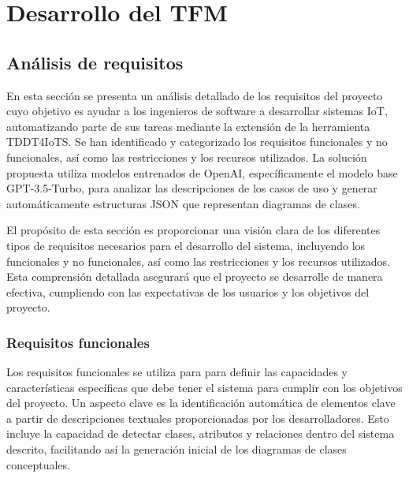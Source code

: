 \chapter{Desarrollo del TFM}\label{chapter:desarrollo}

\section{Análisis de requisitos}

En esta sección se presenta un análisis detallado de los requisitos del proyecto cuyo objetivo es ayudar a los ingenieros de software a desarrollar sistemas IoT, automatizando parte de sus tareas mediante la extensión de la herramienta TDDT4IoTS. Se han identificado y categorizado los requisitos funcionales y no funcionales, así como las restricciones y los recursos utilizados. La solución propuesta utiliza modelos entrenados de OpenAI, específicamente el modelo base GPT-3.5-Turbo, para analizar las descripciones de los casos de uso y generar automáticamente estructuras JSON que representan diagramas de clases.


El propósito de esta sección es proporcionar una visión clara de los diferentes tipos de requisitos necesarios para el desarrollo del sistema, incluyendo los funcionales y no funcionales, así como las restricciones y los recursos utilizados. Esta comprensión detallada asegurará que el proyecto se desarrolle de manera efectiva, cumpliendo con las expectativas de los usuarios y los objetivos del proyecto.

\subsection{Requisitos funcionales}

Los requisitos funcionales se utiliza para para definir las capacidades y características específicas que debe tener el sistema para cumplir con los objetivos del proyecto. Un aspecto clave es la identificación automática de elementos clave a partir de descripciones textuales proporcionadas por los desarrolladores. Esto incluye la capacidad de detectar clases, atributos y relaciones dentro del sistema descrito, facilitando así la generación inicial de los diagramas de clases conceptuales.

